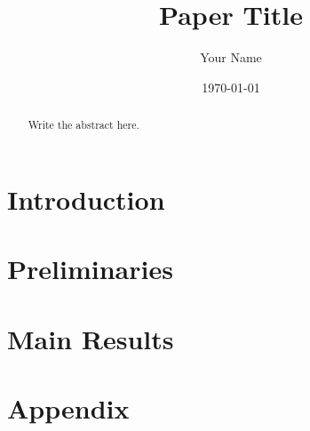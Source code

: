 \documentclass[
  11pt,
  reqno
]{amsart}
\title{Paper Title}
\author{Your Name}
\date{\today}
\begin{document}
\begin{abstract}
Write the abstract here.
\end{abstract}

\maketitle

\tableofcontents

\section{Introduction}


\section{Preliminaries}


\section{Main Results}


\appendix

\section{Appendix}


\printbibliography
\end{document}
